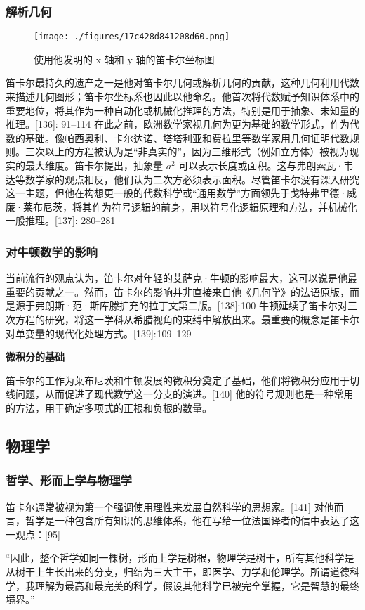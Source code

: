 \subsubsection{解析几何}
\begin{figure}[ht]
\centering
\texttt{[image: ./figures/17c428d841208d60.png]}
\caption{使用他发明的 x 轴和 y 轴的笛卡尔坐标图} \label{fig_DKE_11}
\end{figure}
笛卡尔最持久的遗产之一是他对笛卡尔几何或解析几何的贡献，这种几何利用代数来描述几何图形；笛卡尔坐标系也因此以他命名。他首次将代数赋予知识体系中的重要地位，将其作为一种自动化或机械化推理的方法，特别是用于抽象、未知量的推理。[136]: 91–114 在此之前，欧洲数学家视几何为更为基础的数学形式，作为代数的基础。像帕西奥利、卡尔达诺、塔塔利亚和费拉里等数学家用几何证明代数规则。三次以上的方程被认为是“非真实的”，因为三维形式（例如立方体）被视为现实的最大维度。笛卡尔提出，抽象量 \(a^2\) 可以表示长度或面积。这与弗朗索瓦·韦达等数学家的观点相反，他们认为二次方必须表示面积。尽管笛卡尔没有深入研究这一主题，但他在构想更一般的代数科学或“通用数学”方面领先于戈特弗里德·威廉·莱布尼茨，将其作为符号逻辑的前身，用以符号化逻辑原理和方法，并机械化一般推理。[137]: 280–281
\subsubsection{对牛顿数学的影响}
当前流行的观点认为，笛卡尔对年轻的艾萨克·牛顿的影响最大，这可以说是他最重要的贡献之一。然而，笛卡尔的影响并非直接来自他《几何学》的法语原版，而是源于弗朗斯·范·斯库滕扩充的拉丁文第二版。[138]: 100 牛顿延续了笛卡尔对三次方程的研究，将这一学科从希腊视角的束缚中解放出来。最重要的概念是笛卡尔对单变量的现代化处理方式。[139]: 109–129

\textbf{微积分的基础}

笛卡尔的工作为莱布尼茨和牛顿发展的微积分奠定了基础，他们将微积分应用于切线问题，从而促进了现代数学这一分支的演进。[140] 他的符号规则也是一种常用的方法，用于确定多项式的正根和负根的数量。
\subsection{物理学}
\subsubsection{哲学、形而上学与物理学}
笛卡尔通常被视为第一个强调使用理性来发展自然科学的思想家。[141] 对他而言，哲学是一种包含所有知识的思维体系，他在写给一位法国译者的信中表达了这一观点：[95]

“因此，整个哲学如同一棵树，形而上学是树根，物理学是树干，所有其他科学是从树干上生长出来的分支，归结为三大主干，即医学、力学和伦理学。所谓道德科学，我理解为最高和最完美的科学，假设其他科学已被完全掌握，它是智慧的最终境界。”
